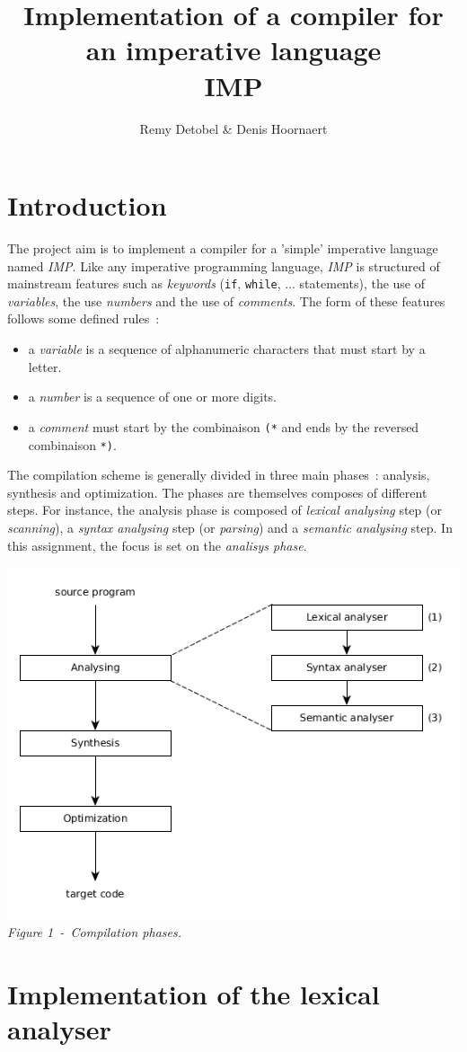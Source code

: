 \documentclass[a4paper,11pt]{article}
\title{Implementation of a compiler for an imperative language\\IMP}
\author{Remy Detobel \& Denis Hoornaert}
\begin{document}
\maketitle
\tableofcontents

\section{Introduction}

  The project aim is to implement a compiler for a 'simple' imperative language named \textit{IMP}. Like any imperative programming language, \textit{IMP} is structured of mainstream features such as \textit{keywords} (\verb|if|, \verb|while|, ... statements), the use of \textit{variables}, the use \textit{numbers} and the use of \textit{comments}.
  The form of these features follows some defined rules~:
  \begin{itemize}
    \item a \textit{variable} is a sequence of alphanumeric characters that must start by a letter.
    \item a \textit{number} is a sequence of one or more digits.
    \item a \textit{comment} must start by the combinaison \verb|(*| and ends by the reversed combinaison \verb|*)|.
  \end{itemize}
  The compilation scheme is generally divided in three main phases~: analysis, synthesis and optimization. The phases are themselves composes of different steps. For instance, the analysis phase is composed of \textit{lexical analysing} step (or \textit{scanning}), a \textit{syntax analysing} step (or \textit{parsing}) and a \textit{semantic analysing} step. In this assignment, the focus is set on the \textit{analisys phase}.
  \begin{center}
    \includegraphics[scale=0.3]{./img/phase_of_compiler.jpg}\\
    \textit{Figure 1~-~Compilation phases.}
  \end{center}
  
\section{Implementation of the lexical analyser}
\end{document}
